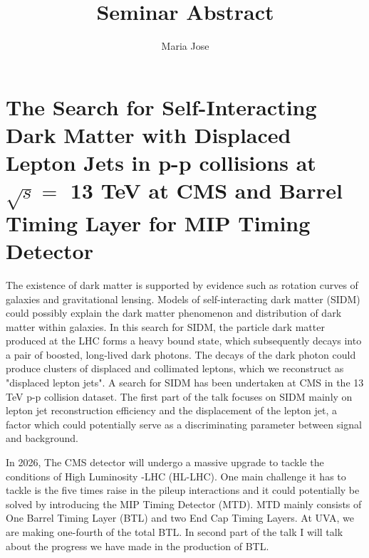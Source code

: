 \documentclass[12pt]{article}
\title{Seminar Abstract}
\author{Maria Jose}
\date{}
\begin{document}
\maketitle
\section*{The Search for Self-Interacting Dark Matter with Displaced Lepton Jets in p-p collisions 
 at $\sqrt{s} =$  13 TeV at CMS and Barrel Timing Layer for MIP Timing Detector}
The existence of dark matter is supported by evidence such as rotation curves of galaxies and gravitational lensing. 
Models of self-interacting dark matter (SIDM) could possibly explain the dark matter phenomenon and distribution of 
dark matter within galaxies. In this search for SIDM, the particle dark matter produced at the LHC forms a heavy 
bound state, which subsequently decays into a pair of boosted, long-lived dark photons. The decays of the dark 
photon could produce clusters of displaced and collimated leptons, which we reconstruct as "displaced lepton jets". A 
search for SIDM has been undertaken at CMS in the 13 TeV p-p collision dataset. The first part of the talk focuses on SIDM 
mainly on lepton jet reconstruction efficiency and the displacement of the lepton jet, a factor which could potentially 
serve as a discriminating parameter between signal and background.


In 2026, The CMS detector will undergo a massive upgrade to tackle the conditions of High Luminosity -LHC (HL-LHC). 
One main challenge it has to tackle is the five times raise in the pileup interactions and it could potentially be 
solved by introducing the MIP Timing Detector (MTD). MTD mainly consists of One Barrel Timing Layer (BTL) and two 
End Cap Timing Layers. At UVA, we are making one-fourth of the total BTL. In second part of the talk I will talk about the progress 
we have made in the production of BTL.
\end{document}
